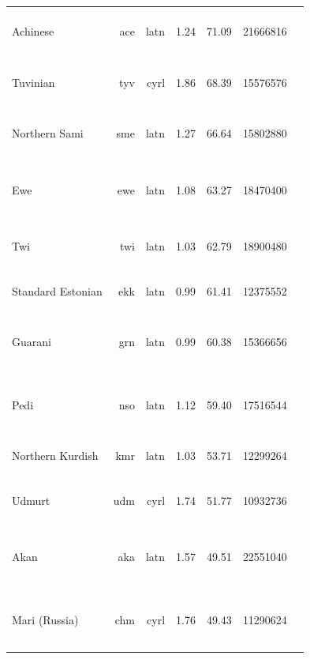 \documentclass[11pt]{article}
\begin{document}
\begin{center}
\begin{longtable}[width=0.9\textwidth]{|lrrrrrl|}
Achinese & ace & latn & 1.24 & 71.09 & 21666816 & {\color{nllb}\rule{3.76cm}{8pt}}{\color{glot500}\rule{0.15cm}{8pt}}{\color{other}\rule{0.0900000000000003cm}{8pt}} \\ 
Tuvinian & tyv & cyrl & 1.86 & 68.39 & 15576576 & {\color{oscar}\rule{0.0cm}{8pt}}{\color{madlad400}\rule{1.41cm}{8pt}}{\color{glot500}\rule{0.34cm}{8pt}}{\color{other}\rule{2.25cm}{8pt}} \\ 
Northern Sami & sme & latn & 1.27 & 66.64 & 15802880 & {\color{madlad400}\rule{3.0cm}{8pt}}{\color{glot500}\rule{0.84cm}{8pt}}{\color{other}\rule{0.16000000000000014cm}{8pt}} \\ 
Ewe & ewe & latn & 1.08 & 63.27 & 18470400 & {\color{nllb}\rule{2.26cm}{8pt}}{\color{madlad400}\rule{1.42cm}{8pt}}{\color{glot500}\rule{0.13cm}{8pt}}{\color{other}\rule{0.1900000000000004cm}{8pt}} \\ 
Twi & twi & latn & 1.03 & 62.79 & 18900480 & {\color{nllb}\rule{3.09cm}{8pt}}{\color{glot500}\rule{0.19cm}{8pt}}{\color{other}\rule{0.7200000000000002cm}{8pt}} \\ 
Standard Estonian & ekk & latn & 0.99 & 61.41 & 12375552 & {\color{glot500}\rule{3.97cm}{8pt}}{\color{other}\rule{0.029999999999999805cm}{8pt}} \\ 
Guarani & grn & latn & 0.99 & 60.38 & 15366656 & {\color{oscar}\rule{0.0cm}{8pt}}{\color{nllb}\rule{2.0cm}{8pt}}{\color{madlad400}\rule{0.97cm}{8pt}}{\color{glot500}\rule{0.62cm}{8pt}}{\color{other}\rule{0.41000000000000014cm}{8pt}} \\ 
Pedi & nso & latn & 1.12 & 59.40 & 17516544 & {\color{nllb}\rule{1.87cm}{8pt}}{\color{madlad400}\rule{1.14cm}{8pt}}{\color{glot500}\rule{0.92cm}{8pt}}{\color{other}\rule{0.07000000000000028cm}{8pt}} \\ 
Northern Kurdish & kmr & latn & 1.03 & 53.71 & 12299264 & {\color{nllb}\rule{3.95cm}{8pt}}{\color{glot500}\rule{0.04999999999999982cm}{8pt}} \\ 
Udmurt & udm & cyrl & 1.74 & 51.77 & 10932736 & {\color{madlad400}\rule{3.21cm}{8pt}}{\color{glot500}\rule{0.2cm}{8pt}}{\color{other}\rule{0.5899999999999999cm}{8pt}} \\ 
Akan & aka & latn & 1.57 & 49.51 & 22551040 & {\color{nllb}\rule{2.22cm}{8pt}}{\color{madlad400}\rule{0.97cm}{8pt}}{\color{glot500}\rule{0.19cm}{8pt}}{\color{other}\rule{0.6199999999999997cm}{8pt}} \\ 
Mari (Russia) & chm & cyrl & 1.76 & 49.43 & 11290624 & {\color{oscar}\rule{0.11cm}{8pt}}{\color{madlad400}\rule{0.51cm}{8pt}}{\color{glot500}\rule{0.24cm}{8pt}}{\color{other}\rule{3.14cm}{8pt}} \\ 

\end{longtable}
\end{center}
\end{document}
